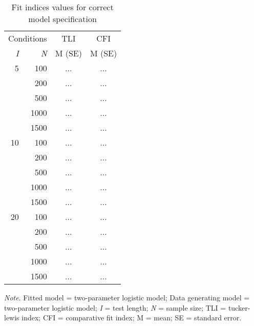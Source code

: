 \documentclass[Royal,sageapa,times,doublespace]{sagej}
\begin{document}
\begin{table}[b!]
\caption{Fit indices values for correct model specification}
\begin{tabular}{ r r | c c }
\toprule
\multicolumn{2}{c}{Conditions} & \multicolumn{1}{c}{TLI} & \multicolumn{1}{c}{CFI} \\
\textit{I} & \textit{N} & M (SE) & M (SE) \\
\midrule
 5 & 100 & ... & ... \\
& 200 & ... & ... \\
& 500 & ... & ... \\
& 1000 & ... & ... \\
& 1500 & ... & ... \\
10 & 100 & ... & ... \\
& 200 & ... & ... \\
& 500 & ... & ... \\
& 1000 & ... & ... \\
& 1500 & ... & ... \\
20 & 100 & ... & ... \\
& 200 & ... & ... \\
& 500 & ... & ... \\
& 1000 & ... & ... \\
& 1500 & ... & ... \\
\bottomrule
\end{tabular}

\bigskip
\small\textit{Note}. Fitted model = two-parameter logistic model; Data generating model = two-parameter logistic model; \textit{I} = test length; \textit{N} = sample size; TLI = tucker-lewis index; CFI = comparative fit index; M = mean; SE = standard error.
\label{tab:4}
\end{table}
\end{document}
